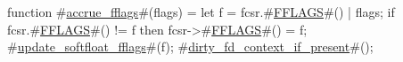 function #\hyperref[sailRISCVzaccruezyfflags]{accrue\_fflags}#(flags) = {
  let f = fcsr.#\hyperref[sailRISCVzFFLAGS]{FFLAGS}#() | flags;
  if  fcsr.#\hyperref[sailRISCVzFFLAGS]{FFLAGS}#() != f
  then {
    fcsr->#\hyperref[sailRISCVzFFLAGS]{FFLAGS}#() = f;
    #\hyperref[sailRISCVzupdatezysoftfloatzyfflags]{update\_softfloat\_fflags}#(f);
    #\hyperref[sailRISCVzdirtyzyfdzycontextzyifzypresent]{dirty\_fd\_context\_if\_present}#();
  }
}
